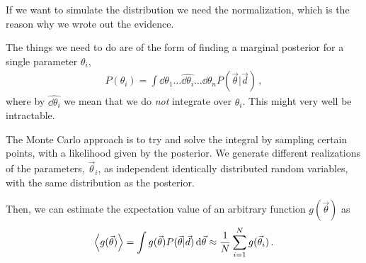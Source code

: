 \documentclass[main.tex]{subfiles}
\begin{document}
If we want to simulate the distribution we need the normalization, which is the reason why we wrote out the evidence. 

The things we need to do are of the form of finding a marginal posterior for a single parameter \(\theta _i\), 
%
\begin{align}
P(\theta _i) = \int \dd{\theta_1} \dots \widehat{ \dd{\theta _i}} \dots \dd{\theta _n} P(\vec{\theta} | \vec{d})
\,,
\end{align}
%
where by \(\widehat{ \dd{\theta _i}}\) we mean that we do \emph{not} integrate over \(\theta_i\).
This might very well be intractable. 

The Monte Carlo approach is to try and solve the integral by sampling certain points, with a likelihood given by the posterior. 
We generate different realizations of the parameters, \(\vec{\theta}_i\), as independent identically distributed random variables, with the same distribution as the posterior.

Then, we can estimate the expectation value of an arbitrary function \(g(\vec{\theta})\) as 
%
\begin{align}
\expval{g(\vec{\theta})} = \int g (\vec{\theta}) P(\vec{\theta} | \vec{d}) \dd{\vec{\theta}} \approx \frac{1}{N} \sum_{i=1}^{N} g(\vec{\theta}_i) 
\,.
\end{align}
\end{document}
